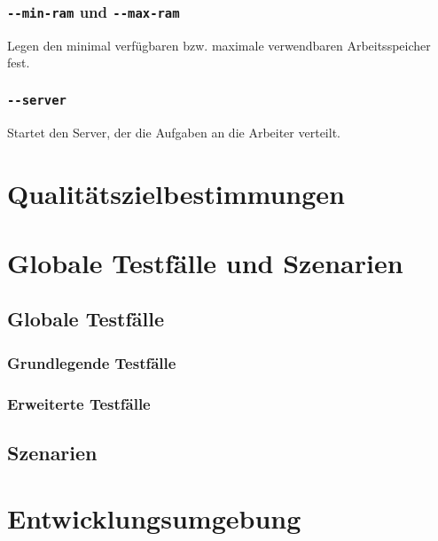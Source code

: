 \documentclass[a4paper,12pt]{article}
\begin{document}
\subsubsection{\texttt{-{}-min-ram} und \texttt{-{}-max-ram}}
Legen den minimal verfügbaren bzw. maximale verwendbaren Arbeitsspeicher fest.

\subsubsection{\texttt{-{}-server}}
Startet den Server, der die Aufgaben an die Arbeiter verteilt.

\section{Qualitätszielbestimmungen}

\section{Globale Testfälle und Szenarien}
\subsection{Globale Testfälle}
\subsubsection{Grundlegende Testfälle}
\subsubsection{Erweiterte Testfälle}
\subsection{Szenarien}
\section{Entwicklungsumgebung}

\clearpage
\printnoidxglossaries
\end{document}

